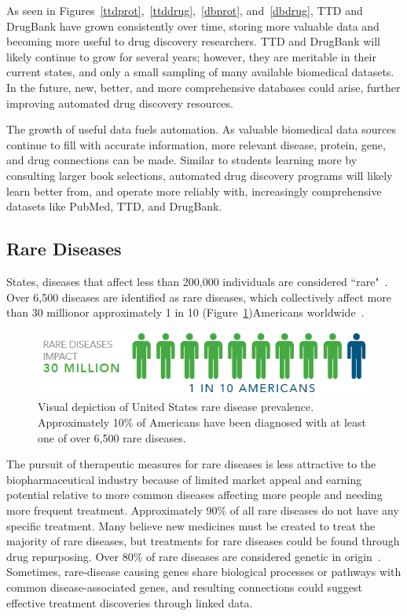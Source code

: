 \documentclass{IEEEtran}
\begin{document}
		
		As seen in Figures~\ref{ttdprot},~\ref{ttddrug},~\ref{dbprot}, and~\ref{dbdrug}, TTD and DrugBank have grown consistently over time, storing more valuable data and becoming more useful to drug discovery researchers. TTD and DrugBank will likely continue to grow for several years; however, they are meritable in their current states, and only a small sampling of many available biomedical datasets. In the future, new, better, and more comprehensive databases could arise, further improving automated drug discovery resources. 
		
		The growth of useful data fuels automation.  As valuable biomedical data sources continue to fill with accurate information, more relevant disease, protein, gene, and drug connections can be made.  Similar to students learning more by consulting larger book selections, automated drug discovery programs will likely learn better from, and operate more reliably with, increasingly comprehensive datasets like PubMed, TTD, and DrugBank.
	
	\subsection{Rare Diseases}
	
	 States, diseases that affect less than 200,000 individuals are considered ``rare"~\cite{raredis}. Over 6,500 diseases are identified as rare diseases, which collectively affect more than 30 million\textemdash or approximately 1 in 10 (Figure~\ref{rd2})\textemdash Americans worldwide~\cite{raredis}. 
	
	\begin{figure}[h]
		\centering
		\includegraphics[width=\linewidth]{rd2}
		\caption{\footnotesize Visual depiction of United States rare disease prevalence. Approximately 10\% of Americans have been diagnosed with at least one of over 6,500 rare diseases.}
		\label{rd2}
	\end{figure} 
	
	The pursuit of therapeutic measures for rare diseases is less attractive to the biopharmaceutical industry because of limited market appeal and earning potential relative to more common diseases affecting more people and needing more frequent treatment. Approximately 90\% of all rare diseases do not have any specific treatment. Many believe new medicines must be created to treat the majority of rare diseases, but treatments for rare diseases could be found through drug repurposing. Over 80\% of rare diseases are considered genetic in origin~\cite{raredis}. Sometimes, rare-disease causing genes share biological processes or pathways with common disease-associated genes, and resulting connections could suggest effective treatment discoveries through linked data.  
	
\end{document}
